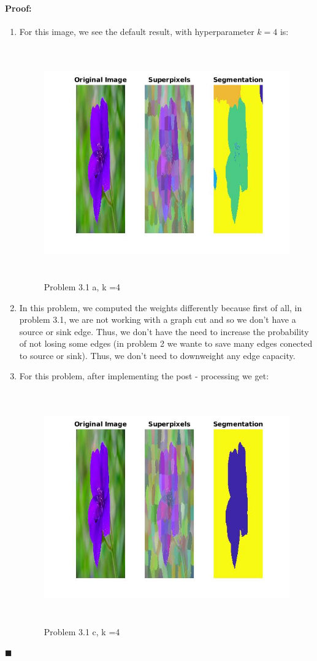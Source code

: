 \documentclass[12pt]{article}
\newenvironment{proof}{\paragraph{Proof: }}{\hfill$\blacksquare$}
\begin{document}
\begin{proof}

\begin{enumerate}
\item For this image, we see the default result, with hyperparameter $k = 4$ is:

\begin{figure}[!htbp]
\centering
\includegraphics[width=14cm,height = 10cm]{max_flower_4.jpg}
\caption{Problem 3.1 a, k =4}
\end{figure}


\item In this problem, we computed the weights differently because first of all, in problem 3.1, we are not working with a graph cut and so we don't have a source or sink edge. Thus, we don't have the need to increase the probability of not losing some edges (in problem 2 we wante to save many edges conected to source or sink). Thus, we don't need to downweight any edge capacity. 

\item For this problem, after implementing the post - processing we get:

\begin{figure}[!htbp]
\centering
\includegraphics[width=14cm,height = 10cm]{max_flower_4_post_pro.jpg}
\caption{Problem 3.1 c, k =4}
\end{figure}


\end{enumerate}
\end{proof}
\end{document}
